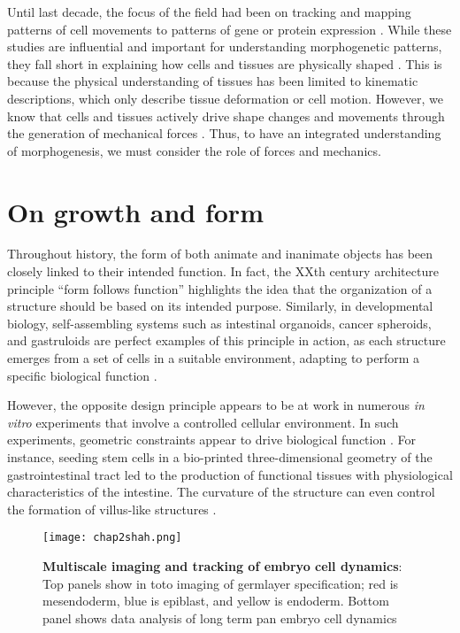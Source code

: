 Until last decade, the focus of the field had been on tracking and mapping patterns of cell movements to patterns of gene or protein expression \cite{gorfinkiel2021}. While these studies are influential and important for understanding morphogenetic patterns, they fall short in explaining how cells and tissues are physically shaped \cite{veenvliet2021, odell1981}. This is because the physical understanding of tissues has been limited to kinematic descriptions, which only describe tissue deformation or cell motion. However, we know that cells and tissues actively drive shape changes and movements through the generation of mechanical forces \cite{lecuit2011}. Thus, to have an integrated understanding of morphogenesis, we must consider the role of forces and mechanics.

\hypertarget{on-growth-and-form}{%
\section{On growth and form}\label{on-growth-and-form}}

Throughout history, the form of both animate and inanimate objects has been closely linked to their intended function. In fact, the XXth century architecture principle ``form follows function'' highlights the idea that the organization of a structure should be based on its intended purpose. Similarly, in developmental biology, self-assembling systems such as intestinal organoids, cancer spheroids, and gastruloids are perfect examples of this principle in action, as each structure emerges from a set of cells in a suitable environment, adapting to perform a specific biological function \cite{gjorevski2016, ishiguro2017, morizane2017, vianello2019}.

However, the opposite design principle appears to be at work in numerous \textit{in vitro} experiments that involve a controlled cellular environment. In such experiments, geometric constraints appear to drive biological function \cite{xi2018}. For instance, seeding stem cells in a bio-printed three-dimensional geometry of the gastrointestinal tract led to the production of functional tissues with physiological characteristics of
the intestine. The curvature of the structure can even control the formation of villus-like structures \cite{brassard2021}. 

\begin{figure}[h!]
	\centering
	\texttt{[image: chap2shah.png]}
	\caption{\label{fig_2_1} \textbf{Multiscale imaging and tracking of embryo cell dynamics}: Top panels show in toto imaging of germlayer specification; red is mesendoderm, blue is epiblast, and yellow is endoderm. Bottom panel shows data analysis of long term pan embryo cell dynamics \cite{shah2019}}
\end{figure}

